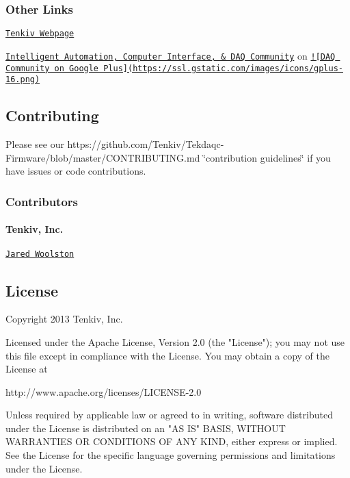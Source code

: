 \subsubsection*{Other Links}


\begin{DoxyItemize}
\item \href{http://www.tenkiv.com/}{\tt Tenkiv Webpage}
\item \href{https://plus.google.com/u/0/communities/109351353187504550254}{\tt Intelligent Automation, Computer Interface, \& D\-A\-Q Community} on \href{https://plus.google.com/u/0/communities/109351353187504550254}{\tt !\mbox{[}D\-A\-Q Community on Google Plus\mbox{]}(https\-://ssl.\-gstatic.\-com/images/icons/gplus-\/16.\-png)}
\end{DoxyItemize}

\subsection*{Contributing}

Please see our https\-://github.com/\-Tenkiv/\-Tekdaqc-\/\-Firmware/blob/master/\-C\-O\-N\-T\-R\-I\-B\-U\-T\-I\-N\-G.\-md \char`\"{}contribution guidelines\char`\"{} if you have issues or code contributions.

\subsubsection*{Contributors}

\paragraph*{Tenkiv, Inc.}


\begin{DoxyItemize}
\item \href{https://github.com/jwoolston}{\tt Jared Woolston}
\end{DoxyItemize}

\subsection*{License}

\begin{DoxyVerb}Copyright 2013 Tenkiv, Inc.

Licensed under the Apache License, Version 2.0 (the "License");
you may not use this file except in compliance with the License.
You may obtain a copy of the License at

http://www.apache.org/licenses/LICENSE-2.0

Unless required by applicable law or agreed to in writing, software
distributed under the License is distributed on an "AS IS" BASIS,
WITHOUT WARRANTIES OR CONDITIONS OF ANY KIND, either express or implied.
See the License for the specific language governing permissions and
limitations under the License.\end{DoxyVerb}
 